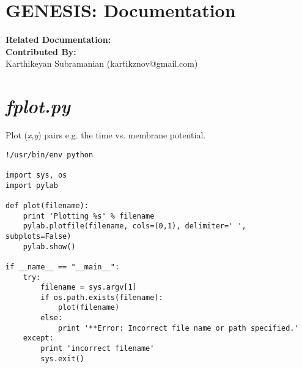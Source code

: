 \documentclass[12pt]{article}
\begin{document}
\section*{GENESIS: Documentation}

{\bf Related Documentation:}
{\\\bf Contributed By:}\\
Karthikeyan Subramanian (kartikznov@gmail.com)\\

\section*{\it fplot.py}

Plot ({\it x},{\it y}) pairs e.g. the time vs. membrane potential. 

\begin{verbatim}
!/usr/bin/env python

import sys, os
import pylab

def plot(filename):
    print 'Plotting %s' % filename
    pylab.plotfile(filename, cols=(0,1), delimiter=' ', subplots=False)
    pylab.show()

if __name__ == "__main__":
    try:
        filename = sys.argv[1]
        if os.path.exists(filename):            
            plot(filename)
        else:
            print '**Error: Incorrect file name or path specified.'
    except:
        print 'incorrect filename'
        sys.exit()
\end{verbatim}
\end{document}
